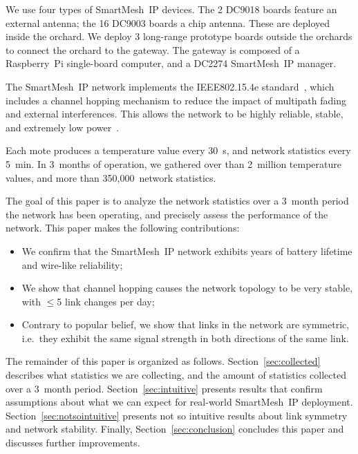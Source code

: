 \documentclass{sig-alternate}
\newcommand{\smip}                {SmartMesh~IP\xspace}
\begin{document}

We use four types of \smip devices.
The 2 DC9018 boards feature an external antenna; the 16 DC9003 boards a chip antenna.
These are deployed inside the orchard.
We deploy 3 long-range prototype boards outside the orchards to connect the orchard to the gateway.
The gateway is composed of a Raspberry~Pi single-board computer, and a DC2274 \smip manager.


The \smip network implements the IEEE802.15.4e standard~\cite{std_ieee802154e_2012}, which includes a channel hopping mechanism to reduce the impact of multipath fading and external interferences.
This allows the network to be highly reliable, stable, and extremely low power~\cite{watteyne10mitigating, watteyne09reliability}.


Each mote produces a temperature value every 30~s, and network statistics every 5~min.
In 3~months of operation, we gathered over than 2~million temperature values, and more than 350,000~network statistics.


The goal of this paper is to analyze the network statistics over a 3~month period the network has been operating, and precisely assess the performance of the network.
This paper makes the following contributions:
\begin{itemize}
    \item We confirm that the \smip network exhibits years of battery lifetime and wire-like reliability;
    \item We show that channel hopping causes the network topology to be very stable, with $\leq$5 link changes per day;
    \item Contrary to popular belief, we show that links in the network are symmetric, i.e.~they exhibit the same signal strength in both directions of the same link.
\end{itemize}


The remainder of this paper is organized as follows.
Section~\ref{sec:collected} describes what statistics we are collecting, and the amount of statistics collected over a 3~month period.
Section~\ref{sec:intuitive} presents results that confirm assumptions about what we can expect for real-world \smip deployment.
Section~\ref{sec:notsointuitive} presents not so intuitive results about link symmetry and network stability.
Finally, Section~\ref{sec:conclusion} concludes this paper and discusses further improvements.
\end{document}

